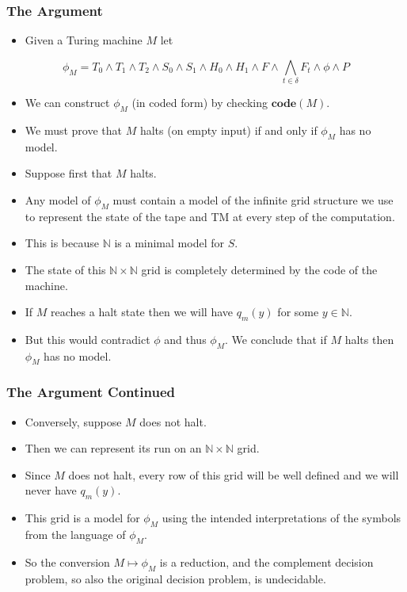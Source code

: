 \documentclass[handout]{beamer}
\newcommand{\co}{\mathbf{code}}
\begin{document}
\begin{frame}
\frametitle{The Argument} 
\begin{itemize} 
\item Given a Turing machine $M$ let
\scriptsize
\end{itemize}
 \[\phi_M = T_0\wedge T_1\wedge T_2 \wedge S_0\wedge S_1\wedge H_0\wedge H_1\wedge F \wedge \bigwedge_{t\in \delta}F_t\wedge \phi\wedge P\]
\normalsize
\begin{itemize}
\item We can construct $\phi_M$ (in coded form) by checking $\co(M)$. 
\item We must prove that $M$ halts (on empty input) if and only if $\phi_M$ has no model.
\item Suppose first that $M$ halts. 
\item Any model of $\phi_M$ must contain a model of the infinite grid structure we use to represent the state of the tape and TM at every step of the computation. 
\item This is because $\mathbb{N}$ is a minimal model for $S$.
\item The state of this $\mathbb{N}\times\mathbb{N}$ grid is completely determined by the code of the machine. 
\item If $M$ reaches a halt state then we will have $q_m(y)$ for some $y\in\mathbb{N}$. 
\item But this would contradict $\phi$ and thus $\phi_M$. We conclude that if $M$ halts then $\phi_M$ has no model.
\end{itemize}  

\end{frame}

\begin{frame}
\frametitle{The Argument Continued} 
\begin{itemize} 
\item Conversely, suppose $M$ does not halt. 
\vspace{0.5cm}
\item Then we can represent its run on an $\mathbb{N}\times\mathbb{N}$ grid. 
\vspace{0.5cm}
\item Since $M$ does not halt, every row of this grid will be well defined and we will never have $q_m(y)$. 
\vspace{0.5cm}
\item This grid is a model for $\phi_M$ using the intended interpretations of the symbols from the language of $\phi_M$.
\vspace{0.5cm}
\item So the conversion $M\mapsto \phi_M$ is a reduction, and the complement decision problem, so also the original decision problem, is undecidable.
\end{itemize}  

\end{frame}
\end{document}
